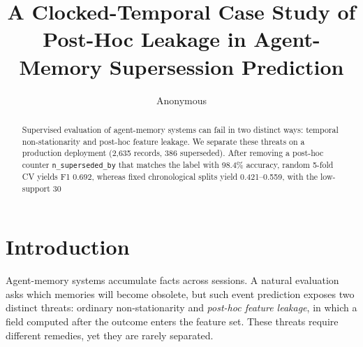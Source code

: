 \documentclass[sigconf,nonacm]{acmart}
\title{A Clocked-Temporal Case Study of Post-Hoc Leakage in Agent-Memory Supersession Prediction}
\author{Anonymous}
\affiliation{\institution{Anonymous Institution}\city{Anonymous}\country{Anonymous}}
\begin{document}
\begin{abstract}
Supervised evaluation of agent-memory systems can fail in two distinct ways: temporal non-stationarity and post-hoc feature leakage. We separate these threats on a production deployment (2,635 records, 386 superseded). After removing a post-hoc counter \texttt{n\_superseded\_by} that matches the label with 98.4\% accuracy, random 5-fold CV yields F1 0.692, whereas fixed chronological splits yield 0.421--0.559, with the low-support 30\\%
\end{abstract}





\maketitle

\section{Introduction}
Agent-memory systems accumulate facts across sessions. A natural evaluation asks which memories will become obsolete, but such event prediction exposes two distinct threats: ordinary non-stationarity and \emph{post-hoc feature leakage}, in which a field computed after the outcome enters the feature set. These threats require different remedies, yet they are rarely separated.
\end{document}
